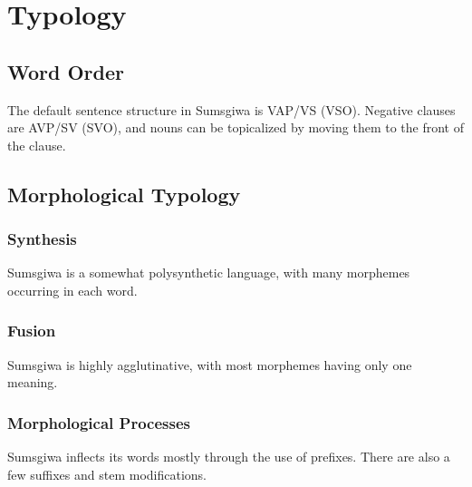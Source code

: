 \section{Typology}

\subsection{Word Order}
The default sentence structure in Sumsgiwa is VAP/VS (VSO). Negative clauses are AVP/SV (SVO), and nouns can be topicalized by moving them to the front of the clause.

\subsection{Morphological Typology}

\subsubsection{Synthesis}
Sumsgiwa is a somewhat polysynthetic language, with many morphemes occurring in each word.

\subsubsection{Fusion}
Sumsgiwa is highly agglutinative, with most morphemes having only one meaning.

\subsubsection{Morphological Processes}
Sumsgiwa inflects its words mostly through the use of prefixes. There are also a few suffixes and stem modifications.